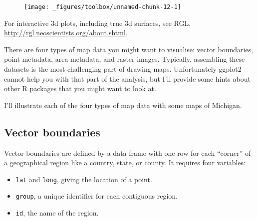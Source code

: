 \begin{Shaded}
\begin{Highlighting}[]
\StringTok{ }\NormalTok{faithfuld[}\NormalTok{(}\NormalTok{, } \NormalTok{), ]}
\StringTok{ }
\StringTok{  }\NormalTok{(}\NormalTok{(}  \NormalTok{/}\NormalTok{) +}\StringTok{ }
\StringTok{  }\NormalTok{()}
\end{Highlighting}
\end{Shaded}

\begin{figure}[H]
  \texttt{[image: \_figures/toolbox/unnamed-chunk-12-1]}
\end{figure}

For interactive 3d plots, including true 3d surfaces, see RGL,
\url{http://rgl.neoscientists.org/about.shtml}.


 

There are four types of map data you might want to visualise: vector
boundaries, point metadata, area metadata, and raster images. Typically,
assembling these datasets is the most challenging part of drawing maps.
Unfortunately ggplot2 cannot help you with that part of the analysis,
but I'll provide some hints about other R packages that you might want
to look at.

I'll illustrate each of the four types of map data with some maps of
Michigan.

\subsection{Vector boundaries}

Vector boundaries are defined by a data frame with one row for each
``corner'' of a geographical region like a country, state, or county. It
requires four variables:

\begin{itemize}
\tightlist
\item
  \texttt{lat} and \texttt{long}, giving the location of a point.
\item
  \texttt{group}, a unique identifier for each contiguous region.
\item
  \texttt{id}, the name of the region.
\end{itemize}

